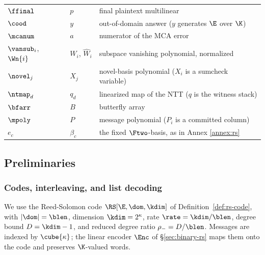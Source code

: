 \begin{center}
\begin{tabular}{@{}lll@{}}
$\ffinal$      & $p$          & final plaintext multilinear\\
$\cood$        & $y$          & out-of-domain answer ($y$ generates $\E$ over $\K$)\\
$\mcanum$      & $a$          & numerator of the MCA error\\
$\vansub_i$, $\Wn{i}$ & $W_i$, $\widehat W_i$ & subspace vanishing polynomial, normalized\\
$\novel_j$     & $X_j$        & novel-basis polynomial ($X_i$ is a sumcheck variable)\\
$\ntmap_d$     & $q_d$        & linearized map of the NTT ($q$ is the witness stack)\\
$\bfarr$       & $B$          & butterfly array\\
$\mpoly$       & $P$          & message polynomial ($P_i$ is a committed column)\\
$e_c$          & $\beta_c$    & the fixed $\Ftwo$-basis, as in Annex \ref{annex:rs}\\
\hline
\end{tabular}
\end{center}

\subsection{Preliminaries}\label{sec:prelims}

\subsubsection{Codes, interleaving, and list decoding}\label{sec:codes}

We use the Reed-Solomon code $\RS[\E,\dom,\kdim]$ of Definition~\ref{def:rs-code}, with $|\dom|=\blen$, dimension $\kdim=2^\kappa$, rate $\rate=\kdim/\blen$, degree bound $D=\kdim-1$, and reduced degree ratio $\rho_-=D/\blen$. Messages are indexed by $\cube{\kappa}$; the linear encoder $\Enc$ of \S\ref{sec:binary-rs} maps them onto the code and preserves $\K$-valued words.

